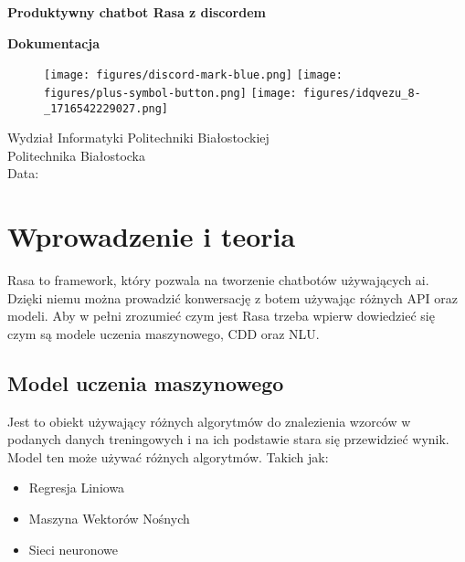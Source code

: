 \documentclass{article}
\begin{document}
\begin{titlepage}
    \AddToShipoutPicture*{\BackgroundPic}

   \begin{center}
       \textbf{Produktywny chatbot Rasa z discordem}

       \textbf{Dokumentacja}


        \vspace{5cm}  
        
        \begin{figure}[htp]

        \centering
        \texttt{[image: figures/discord-mark-blue.png]}\hfill
        \texttt{[image: figures/plus-symbol-button.png]}\hfill
        \texttt{[image: figures/idqvezu\_8-\_1716542229027.png]}


        \end{figure}     
     
            
        \vspace{8cm}  

       Wydział Informatyki Politechniki Białostockiej\\
       Politechnika Białostocka\\
       Data:
            
   \end{center}
\end{titlepage}

\tableofcontents

\section{Wprowadzenie i teoria}
Rasa to framework, który pozwala na tworzenie chatbotów używających ai. Dzięki
niemu można prowadzić konwersację z botem używając różnych API oraz modeli. Aby
w pełni zrozumieć czym jest Rasa trzeba wpierw dowiedzieć się czym są modele
uczenia maszynowego, CDD oraz NLU.

\subsection{Model uczenia maszynowego}
Jest to obiekt używający różnych algorytmów do znalezienia wzorców w podanych
danych treningowych i na ich podstawie stara się przewidzieć wynik. Model ten
może używać różnych algorytmów. Takich jak:
\begin{itemize}
    \item[\textcolor{violet}{\textbullet}] Regresja Liniowa
    \item[\textcolor{violet}{\textbullet}] Maszyna Wektorów Nośnych
    \item[\textcolor{violet}{\textbullet}] Sieci neuronowe
\end{itemize}
\end{document}
